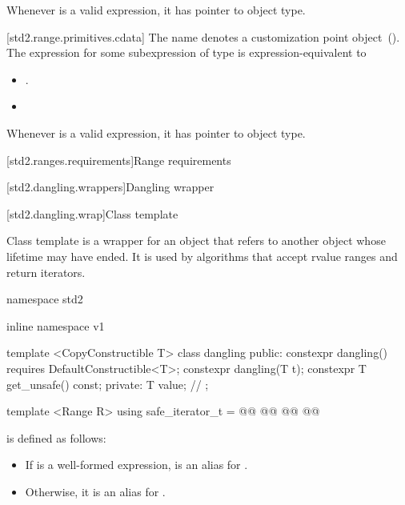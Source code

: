 \pnum
\enternote Whenever  is a valid expression, it
has pointer to object type. \exitnote

[std2.range.primitives.cdata]{}
\pnum
The name  denotes a customization point
object~(). The expression
 for some subexpression  of type 
is expression-equivalent to\added{:}
\begin{itemize}
\item
  .
\item
\end{itemize}

\pnum
{}

\pnum
\enternote Whenever  is a valid expression, it
has pointer to object type. \exitnote

[std2.ranges.requirements]{Range requirements}


[std2.dangling.wrappers]{Dangling wrapper}

[std2.dangling.wrap]{Class template }

\pnum
{}%
Class template  is a wrapper for an object that refers to another object whose
lifetime may have ended. It is used by algorithms that accept rvalue ranges and return iterators.

\begin{codeblock}
namespace std2 { inline namespace v1 {
  template <CopyConstructible T>
  class dangling {
  public:
    constexpr dangling() requires DefaultConstructible<T>;
    constexpr dangling(T t);
    constexpr T get_unsafe() const;
  private:
    T value; // \expos
  };

  template <Range R>
  using safe_iterator_t = @\added{// \seebelow}@
    @@
      @@
      @@
}}
\end{codeblock}

\begin{addedblock}
\pnum
{} is defined as follows:
\begin{itemize}
\item
  If  is a well-formed expression,
   is an alias for .
\item
  Otherwise, it is an alias for .
\end{itemize}
\end{addedblock}

